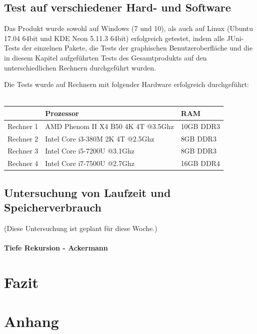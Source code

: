 \documentclass[parskip=full]{scrartcl}
\begin{document}
\subsection{Test auf verschiedener Hard- und Software}

Das Produkt wurde sowohl auf Windows (7 und 10), als auch auf Linux (Ubuntu 17.04 64bit und KDE Neon 5.11.3 64bit) erfolgreich getestet, indem alle JUni-Tests der einzelnen Pakete, die Tests der graphischen Benutzeroberfläche und die in diesem Kapitel aufgeführten Tests des Gesamtprodukts auf den unterschiedlichen Rechnern durchgeführt wurden.

Die Tests wurde auf Rechnern mit folgender Hardware erfolgreich durchgeführt: \\ \\
\begin{tabular}{l||l|l}
   	 & Prozessor & RAM \\
	\hline
	\hline
	Rechner 1 & AMD Phenom II X4 B50 4K 4T @3.5Ghz & 10GB DDR3 \\
	Rechner 2 & Intel Core i3-380M 2K 4T @2.5Ghz & 8GB DDR3 \\
	Rechner 3 & Intel Core i5-7200U @3.1Ghz & 8GB DDR3 \\
	Rechner 4 & Intel Core i7-7500U @2.7Ghz & 16GB DDR4\\
\end{tabular}


\subsection{Untersuchung von Laufzeit und Speicherverbrauch}
(Diese Untersuchung ist geplant für diese Woche.)

\paragraph{Tiefe Rekursion - Ackermann}

\newpage
\section{Fazit}



\newpage

\printglossary[style=altlist, toctitle=Glossar]
\newpage

\section{Anhang}
\end{document}
